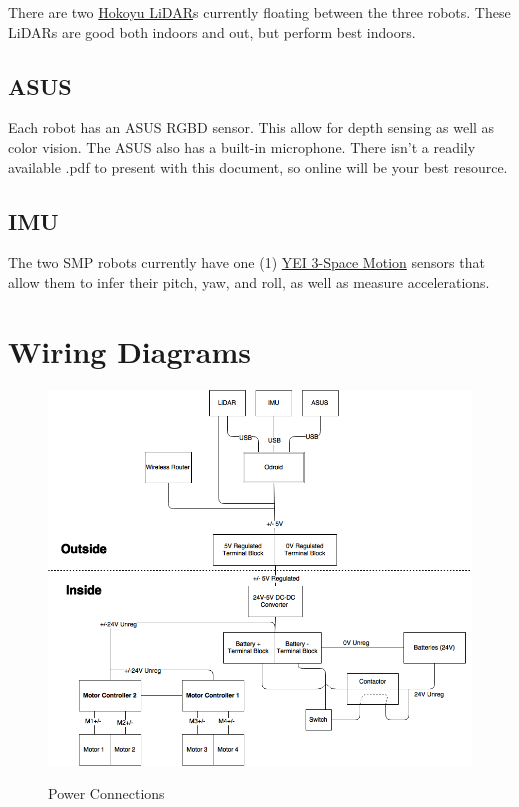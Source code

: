 There are two \href{run:HokoyuURG_Datasheet.pdf}{Hokoyu LiDAR}s currently floating between the three robots. These LiDARs are good both indoors and out, but perform best indoors.

\subsection{ASUS}

Each robot has an ASUS RGBD sensor. This allow for depth sensing as well as color vision. The ASUS also has a built-in microphone. There isn't a readily available .pdf to present with this document, so online will be your best resource.

\subsection{IMU}

The two SMP robots currently have one (1) \href{run:HokoyuURG_Datasheet.pdf}{YEI 3-Space Motion} sensors that allow them to infer their pitch, yaw, and roll, as well as measure accelerations.

\section{Wiring Diagrams}


\begin{figure}[h]
\centering
\includegraphics[width=\textwidth]{PowerDiagram.png}
\label{fig:powerdiagram}
\caption{Power Connections}
\end{figure}

